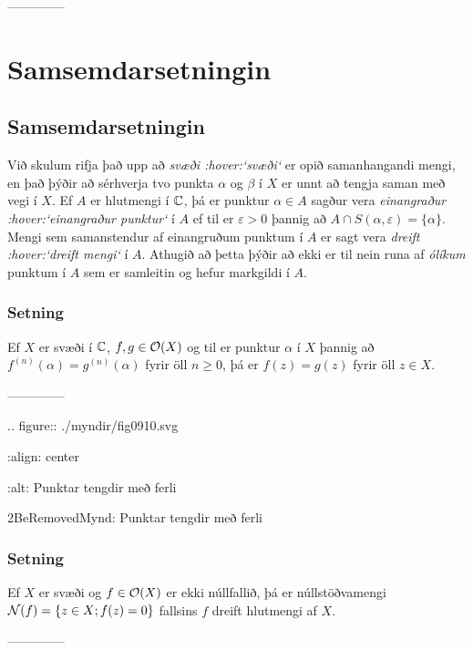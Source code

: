 --------------




\section{Samsemdarsetningin}

\subsection{Samsemdarsetningin}

\noindent
Við skulum rifja það upp að {\it svæði :hover:`svæði`} er opið
samanhangandi mengi, en það þýðir að sérhverja tvo punkta
$\alpha$ og $\beta$ í $X$ er unnt að tengja saman með vegi í $X$.  Ef
$A$ er hlutmengi í ${\mathbb C}$, þá er punktur $\alpha\in A$ sagður vera
{\it einangraður :hover:`einangraður punktur`} í $A$ ef til er
$\varepsilon>0$ þannig að $A\cap S(\alpha,\varepsilon)=\{\alpha\}$.
Mengi sem samanstendur af einangruðum punktum í $A$ er sagt vera {\it
dreift :hover:`dreift mengi`} í $A$.   Athugið að þetta þýðir að ekki er til
nein runa af {\it ólíkum } punktum í $A$ sem er samleitin og hefur
markgildi í $A$.

\subsubsection{Setning}  
Ef $X$ er svæði í ${\mathbb C}$, $f,g\in {\cal O}(X)$ og 
til er punktur ${\alpha}$ í $X$ þannig að
$f^{(n)}({\alpha})=g^{(n)}({\alpha})$ fyrir öll $n\geq 0$, 
þá er $f(z)=g(z)$ fyrir öll $z\in X$.  


--------------




.. figure:: ./myndir/fig0910.svg

    :align: center

    :alt:  Punktar tengdir með ferli

    2BeRemovedMynd:  Punktar tengdir með ferli




\subsubsection{Setning}
  Ef $X$ er svæði og $f\in {\cal O}(X)$ er ekki núllfallið, þá er
núllstöðvamengi ${\cal N}(f)=\{z\in X; f(z)=0\}$ fallsins $f$ dreift hlutmengi af $X$.


--------------




